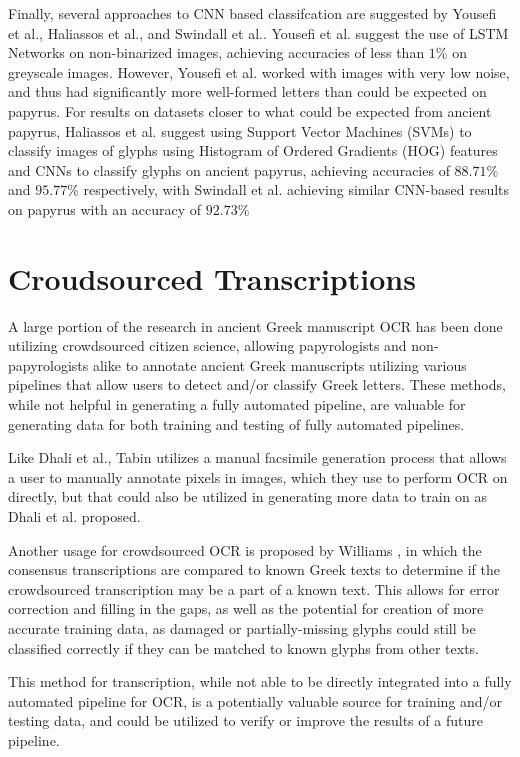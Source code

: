 Finally, several approaches to CNN based classifcation are suggested by Yousefi et al.\cite{Yousefi}, Haliassos et al.\cite{Haliassos}, and Swindall et al.\cite{Swindall}. Yousefi et al. suggest the use of LSTM Networks on non-binarized images, achieving accuracies of less than $1\%$ on greyscale images. However, Yousefi et al. worked with images with very low noise, and thus had significantly more well-formed letters than could be expected on papyrus. For results on datasets closer to what could be expected from ancient papyrus, Haliassos et al.\cite{Haliassos} suggest using Support Vector Machines (SVMs) to classify images of glyphs using Histogram of Ordered Gradients (HOG) features and CNNs to classify glyphs on ancient papyrus, achieving accuracies of $88.71\%$ and $95.77\%$ respectively, with Swindall et al.\cite{Swindall} achieving similar CNN-based results on papyrus with an accuracy of $92.73\%$

\section{Croudsourced Transcriptions}
A large portion of the research in ancient Greek manuscript OCR has been done utilizing crowdsourced citizen science, allowing papyrologists and non-papyrologists alike to annotate ancient Greek manuscripts utilizing various pipelines that allow users to detect and/or classify Greek letters.\cite{Williams2014, Williams2015, Tabin, Atanasiu} These methods, while not helpful in generating a fully automated pipeline, are valuable for generating data for both training and testing of fully automated pipelines.

Like Dhali et al.\cite{Dhali2019}, Tabin\cite{Tabin} utilizes a manual facsimile generation process that allows a user to manually annotate pixels in images, which they use to perform OCR on directly, but that could also be utilized in generating more data to train on as Dhali et al.\cite{Dhali2019} proposed.

Another usage for crowdsourced OCR is proposed by Williams \cite{Williams2014}, in which the consensus transcriptions are compared to known Greek texts to determine if the crowdsourced transcription may be a part of a known text. This allows for error correction and filling in the gaps, as well as the potential for creation of more accurate training data, as damaged or partially-missing glyphs could still be classified correctly if they can be matched to known glyphs from other texts.

This method for transcription, while not able to be directly integrated into a fully automated pipeline for OCR, is a potentially valuable source for training and/or testing data, and could be utilized to verify or improve the results of a future pipeline.
